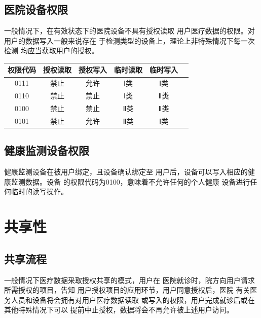 \documentclass[UTF8]{ctexart}
\begin{document}
    \subsection{医院设备权限}
    \par
    一般情况下，在有效状态下的医院设备不具有授权读取 %
    用户医疗数据的权限。对用户的数据写入一般来说存在
    于检测类型的设备上，理论上非特殊情况下每一次检测
    均应当获取用户的授权。
    \begin{center}
    \begin{tabular}{cccccc}
        \hline
        权限代码& 授权读取& 授权写入& 临时读取& 临时写入\\
        \hline
        0111& 禁止& 允许& Ⅰ类& Ⅰ类\\
        0110& 禁止& 禁止& Ⅰ类& Ⅱ类\\
        0100& 禁止& 禁止& Ⅱ类& Ⅱ类\\
        0101& 禁止& 允许& Ⅱ类& Ⅰ类\\
        \hline
    \end{tabular}
    \end{center}
    \subsection{健康监测设备权限}
    \par
    健康监测设备在被用户绑定，且设备确认绑定至
    用户后，设备可以写入相应的健康监测数据。设备
    的权限代码为0100，意味着不允许任何的个人健康
    设备进行任何临时的读写操作。

    \section{共享性}
    \subsection{共享流程}
    \par
    一般情况下医疗数据采取授权共享的模式，用户在
    医院就诊时，院方向用户请求所需授权的项目，告知 %
    用户授权项目的应用环节，用户同意授权后，医院
    有关医务人员和设备将会拥有对用户医疗数据读取
    或写入的权限，用户完成就诊后或在其他特殊情况下可以
    提前中止授权，数据将会不再允许被上述用户访问。
\end{document}
